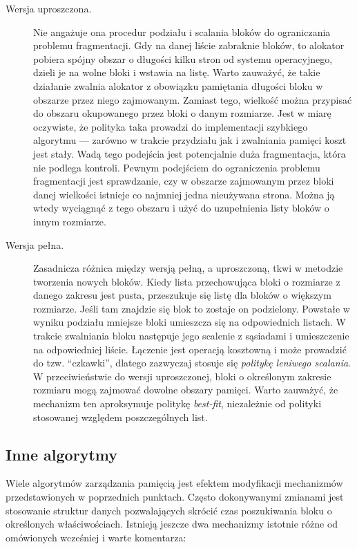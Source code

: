 \documentclass[12pt,a4paper,titlepage,twoside]{mwart}
\begin{document}
\begin{description}
\item[Wersja uproszczona.] Nie angażuje ona procedur podziału i scalania
bloków do ograniczania problemu fragmentacji. Gdy na danej liście zabraknie
bloków, to alokator pobiera spójny obszar o długości kilku stron od systemu
operacyjnego, dzieli je na wolne bloki i wstawia na listę. Warto zauważyć, że
takie działanie zwalnia alokator z obowiązku pamiętania długości bloku w
obszarze przez niego zajmowanym. Zamiast tego, wielkość można przypisać do
obszaru okupowanego przez bloki o danym rozmiarze. Jest w miarę oczywiste, że
polityka taka prowadzi do implementacji szybkiego algorytmu --- zarówno w
trakcie przydziału jak i zwalniania pamięci koszt jest stały. Wadą tego
podejścia jest potencjalnie duża fragmentacja, która nie podlega kontroli.
Pewnym podejściem do ograniczenia problemu fragmentacji jest sprawdzanie, czy w
obszarze zajmowanym przez bloki danej wielkości istnieje co najmniej jedna
nieużywana strona. Można ją wtedy wyciągnąć z tego obszaru i użyć do
uzupełnienia listy bloków o innym rozmiarze.
\vspace{1ex}

\item[Wersja pełna.] Zasadnicza różnica między wersją pełną, a uproszczoną,
tkwi w metodzie tworzenia nowych bloków. Kiedy lista przechowująca bloki o
rozmiarze z danego zakresu jest pusta, przeszukuje się listę dla bloków o
większym rozmiarze. Jeśli tam znajdzie się blok to zostaje on podzielony.
Powstałe w wyniku podziału mniejsze bloki umieszcza się na odpowiednich
listach. W trakcie zwalniania bloku następuje jego scalenie z sąsiadami i
umieszczenie na odpowiedniej liście. Łączenie jest operacją kosztowną i może
prowadzić do tzw. ``czkawki'', dlatego zazwyczaj stosuje się \textit{politykę
leniwego scalania}. W przeciwieństwie do wersji uproszczonej, bloki o
określonym zakresie rozmiaru mogą zajmować dowolne obszary pamięci.  Warto
zauważyć, że mechanizm ten aproksymuje politykę \textit{best-fit}, niezależnie
od polityki stosowanej względem poszczególnych list.

\end{description}

\subsection{Inne algorytmy}

Wiele algorytmów zarządzania pamięcią jest efektem modyfikacji mechanizmów
przedstawionych w poprzednich punktach. Często dokonywanymi zmianami jest
stosowanie struktur danych pozwalających skrócić czas poszukiwania bloku o
określonych właściwościach. Istnieją jeszcze dwa mechanizmy istotnie różne od
omówionych wcześniej i warte komentarza:
\end{document}

